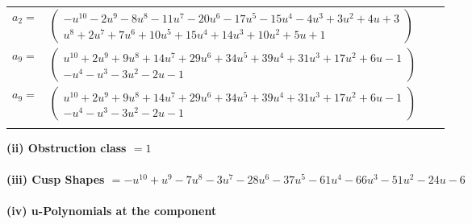 \documentclass[1p]{elsarticle_modified}
\theoremstyle{definition}
\begin{document}
\begin{tabular}{m{7pt} m{180pt} m{7pt} m{180pt} }
\flushright $a_{2}=$&$\begin{pmatrix}- u^{10}-2 u^9-8 u^8-11 u^7-20 u^6-17 u^5-15 u^4-4 u^3+3 u^2+4 u+3\\u^8+2 u^7+7 u^6+10 u^5+15 u^4+14 u^3+10 u^2+5 u+1\end{pmatrix}$ \\
\flushright $a_{9}=$&$\begin{pmatrix}u^{10}+2 u^9+9 u^8+14 u^7+29 u^6+34 u^5+39 u^4+31 u^3+17 u^2+6 u-1\\- u^4- u^3-3 u^2-2 u-1\end{pmatrix}$\\ \flushright $a_{9}=$&$\begin{pmatrix}u^{10}+2 u^9+9 u^8+14 u^7+29 u^6+34 u^5+39 u^4+31 u^3+17 u^2+6 u-1\\- u^4- u^3-3 u^2-2 u-1\end{pmatrix}$\\&\end{tabular}
\flushleft \textbf{(ii) Obstruction class $= 1$}\\~\\
\flushleft \textbf{(iii) Cusp Shapes $= - u^{10}+u^9-7 u^8-3 u^7-28 u^6-37 u^5-61 u^4-66 u^3-51 u^2-24 u-6$}\\~\\
\newpage\renewcommand{\arraystretch}{1}
\flushleft \textbf{(iv) u-Polynomials at the component}\newline \\
\end{document}
